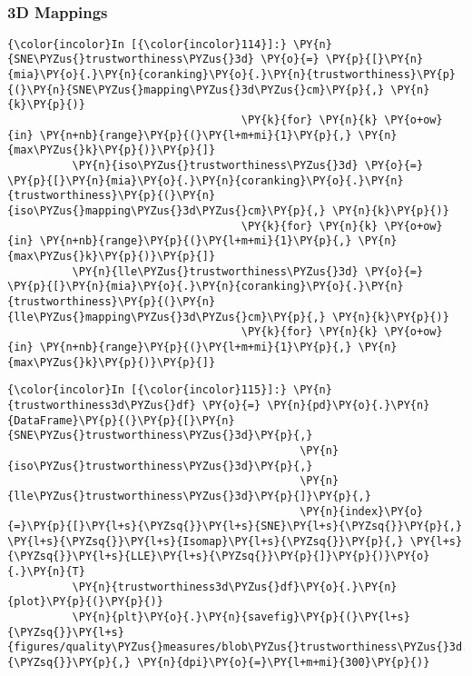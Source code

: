     \begin{center}
    \end{center}
    { \hspace*{\fill} \\}

    \subsubsection{3D Mappings}\label{d-mappings}

    \begin{Verbatim}[commandchars=\\\{\}]
{\color{incolor}In [{\color{incolor}114}]:} \PY{n}{SNE\PYZus{}trustworthiness\PYZus{}3d} \PY{o}{=} \PY{p}{[}\PY{n}{mia}\PY{o}{.}\PY{n}{coranking}\PY{o}{.}\PY{n}{trustworthiness}\PY{p}{(}\PY{n}{SNE\PYZus{}mapping\PYZus{}3d\PYZus{}cm}\PY{p}{,} \PY{n}{k}\PY{p}{)}
                                    \PY{k}{for} \PY{n}{k} \PY{o+ow}{in} \PY{n+nb}{range}\PY{p}{(}\PY{l+m+mi}{1}\PY{p}{,} \PY{n}{max\PYZus{}k}\PY{p}{)}\PY{p}{]}
          \PY{n}{iso\PYZus{}trustworthiness\PYZus{}3d} \PY{o}{=} \PY{p}{[}\PY{n}{mia}\PY{o}{.}\PY{n}{coranking}\PY{o}{.}\PY{n}{trustworthiness}\PY{p}{(}\PY{n}{iso\PYZus{}mapping\PYZus{}3d\PYZus{}cm}\PY{p}{,} \PY{n}{k}\PY{p}{)}
                                    \PY{k}{for} \PY{n}{k} \PY{o+ow}{in} \PY{n+nb}{range}\PY{p}{(}\PY{l+m+mi}{1}\PY{p}{,} \PY{n}{max\PYZus{}k}\PY{p}{)}\PY{p}{]}
          \PY{n}{lle\PYZus{}trustworthiness\PYZus{}3d} \PY{o}{=} \PY{p}{[}\PY{n}{mia}\PY{o}{.}\PY{n}{coranking}\PY{o}{.}\PY{n}{trustworthiness}\PY{p}{(}\PY{n}{lle\PYZus{}mapping\PYZus{}3d\PYZus{}cm}\PY{p}{,} \PY{n}{k}\PY{p}{)}
                                    \PY{k}{for} \PY{n}{k} \PY{o+ow}{in} \PY{n+nb}{range}\PY{p}{(}\PY{l+m+mi}{1}\PY{p}{,} \PY{n}{max\PYZus{}k}\PY{p}{)}\PY{p}{]}
\end{Verbatim}

    \begin{Verbatim}[commandchars=\\\{\}]
{\color{incolor}In [{\color{incolor}115}]:} \PY{n}{trustworthiness3d\PYZus{}df} \PY{o}{=} \PY{n}{pd}\PY{o}{.}\PY{n}{DataFrame}\PY{p}{(}\PY{p}{[}\PY{n}{SNE\PYZus{}trustworthiness\PYZus{}3d}\PY{p}{,}
                                             \PY{n}{iso\PYZus{}trustworthiness\PYZus{}3d}\PY{p}{,}
                                             \PY{n}{lle\PYZus{}trustworthiness\PYZus{}3d}\PY{p}{]}\PY{p}{,}
                                             \PY{n}{index}\PY{o}{=}\PY{p}{[}\PY{l+s}{\PYZsq{}}\PY{l+s}{SNE}\PY{l+s}{\PYZsq{}}\PY{p}{,} \PY{l+s}{\PYZsq{}}\PY{l+s}{Isomap}\PY{l+s}{\PYZsq{}}\PY{p}{,} \PY{l+s}{\PYZsq{}}\PY{l+s}{LLE}\PY{l+s}{\PYZsq{}}\PY{p}{]}\PY{p}{)}\PY{o}{.}\PY{n}{T}
          \PY{n}{trustworthiness3d\PYZus{}df}\PY{o}{.}\PY{n}{plot}\PY{p}{(}\PY{p}{)}
          \PY{n}{plt}\PY{o}{.}\PY{n}{savefig}\PY{p}{(}\PY{l+s}{\PYZsq{}}\PY{l+s}{figures/quality\PYZus{}measures/blob\PYZus{}trustworthiness\PYZus{}3d.png}\PY{l+s}{\PYZsq{}}\PY{p}{,} \PY{n}{dpi}\PY{o}{=}\PY{l+m+mi}{300}\PY{p}{)}
\end{Verbatim}

